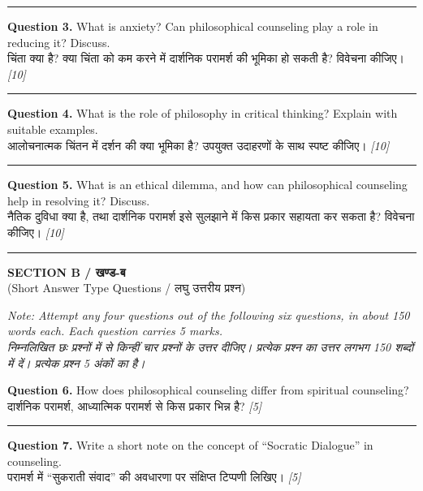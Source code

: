 \documentclass[11pt,a4paper]{article}
\newcommand{\pts}[1]{\hfill \textit{[#1]}}
\begin{document}
\medskip\rule{\linewidth}{0.2pt}\medskip

\noindent \textbf{Question 3.} What is anxiety? Can philosophical counseling play a role in reducing it? Discuss.\\[1pt]
चिंता क्या है? क्या चिंता को कम करने में दार्शनिक परामर्श की भूमिका हो सकती है? विवेचना कीजिए। \pts{10}

\medskip\rule{\linewidth}{0.2pt}\medskip

\noindent \textbf{Question 4.} What is the role of philosophy in critical thinking? Explain with suitable examples.\\[1pt]
आलोचनात्मक चिंतन में दर्शन की क्या भूमिका है? उपयुक्त उदाहरणों के साथ स्पष्ट कीजिए। \pts{10}

\medskip\rule{\linewidth}{0.2pt}\medskip

\noindent \textbf{Question 5.} What is an ethical dilemma, and how can philosophical counseling help in resolving it? Discuss.\\[1pt]
नैतिक दुविधा क्या है, तथा दार्शनिक परामर्श इसे सुलझाने में किस प्रकार सहायता कर सकता है? विवेचना कीजिए। \pts{10}

\bigskip
\rule{\linewidth}{0.2pt}
\bigskip

\begin{center}
  {\large\bfseries SECTION B / खण्ड-ब}\\[2pt]
  {\normalsize (Short Answer Type Questions / लघु उत्तरीय प्रश्न)}
\end{center}

\noindent \textit{Note: Attempt any four questions out of the following six questions, in about 150 words each. Each question carries 5 marks.}\\[2pt]
\noindent \textit{निम्नलिखित छः प्रश्नों में से किन्हीं चार प्रश्नों के उत्तर दीजिए। प्रत्येक प्रश्न का उत्तर लगभग 150 शब्दों में दें। प्रत्येक प्रश्न 5 अंकों का है।}

\bigskip

\noindent \textbf{Question 6.} How does philosophical counseling differ from spiritual counseling?\\[1pt]
दार्शनिक परामर्श, आध्यात्मिक परामर्श से किस प्रकार भिन्न है? \pts{5}

\medskip\rule{\linewidth}{0.2pt}\medskip

\noindent \textbf{Question 7.} Write a short note on the concept of ``Socratic Dialogue'' in counseling.\\[1pt]
परामर्श में ``सुकराती संवाद'' की अवधारणा पर संक्षिप्त टिप्पणी लिखिए। \pts{5}
\end{document}
